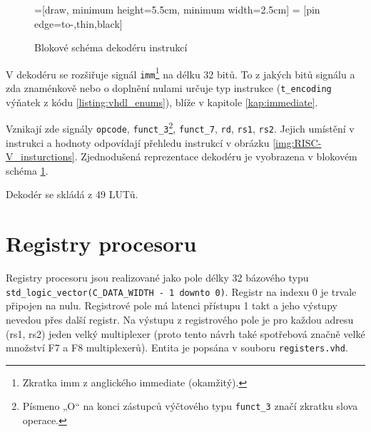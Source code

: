 \documentclass[FM,BP]{tulthesis}
\begin{document}
\begin{figure}[h]
	\centering
	
	=[draw, minimum height=5.5cm, minimum width=2.5cm]
     = [pin edge={to-,thin,black}]
    
	
	\caption{Blokové schéma dekodéru instrukcí}
	\label{fig:decoder}
\end{figure}


V dekodéru se rozšiřuje signál \verb|imm|\footnote{Zkratka imm z anglického immediate (okamžitý).} na délku 32 bitů. To z jakých bitů signálu a zda znaménkově nebo o doplnění nulami určuje typ instrukce (\verb|t_encoding| výňatek z kódu \ref{listing:vhdl_enums}), blíže v kapitole \ref{kap:immediate}. 

Vznikají zde signály \verb|opcode|, \verb|funct_3|\footnote{Písmeno „O“ na konci zástupců výčtového typu \verb|funct_3| značí zkratku slova operace.}, \verb|funct_7|, \verb|rd|, \verb|rs1|, \verb|rs2|. 
Jejich umístění v instrukci a hodnoty odpovídají přehledu instrukcí v obrázku \ref{img:RISC-V_insturctions}. Zjednodušená reprezentace dekodéru je vyobrazena v blokovém schéma \ref{fig:decoder}.

Dekodér se skládá z 49 LUTů. 

\section{Registry procesoru}
Registry procesoru jsou realizované jako pole délky 32 bázového typu \verb|std_logic_vector(C_DATA_WIDTH - 1 downto 0)|. Registr na indexu 0 je trvale připojen na nulu. Registrové pole má latenci přístupu 1 takt a jeho výstupy nevedou přes další registr. Na výstupu z registrového pole je pro každou adresu (rs1, rs2) jeden velký multiplexer (proto tento návrh také spotřebová značně velké množství F7 a F8 multiplexerů). Entita je popsána v souboru \verb|registers.vhd|.
\end{document}

